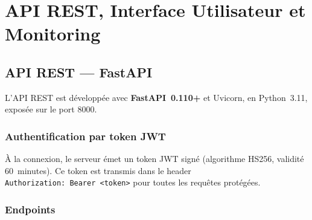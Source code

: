 \documentclass[12pt,a4paper]{report}
\begin{document}
\chapter{API REST, Interface Utilisateur et Monitoring}

\section{API REST --- FastAPI}

L'API REST est développée avec \textbf{FastAPI~0.110+} et Uvicorn,
en Python~3.11, exposée sur le port 8000.

\subsection{Authentification par token JWT}

À la connexion, le serveur émet un token JWT signé (algorithme HS256,
validité 60~minutes). Ce token est transmis dans le header
\texttt{Authorization:~Bearer~<token>} pour toutes les requêtes protégées.

\subsection{Endpoints}
\end{document}
